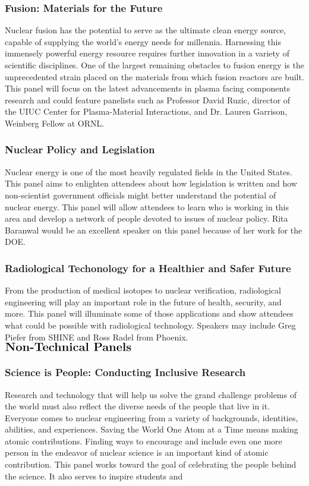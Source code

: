 \subsubsection{Fusion: Materials for the Future}
Nuclear fusion has the potential to serve as the ultimate clean energy source, capable of supplying the world’s energy needs for millennia. Harnessing this immensely powerful energy resource requires further innovation in a variety of scientific disciplines. One of the largest remaining obstacles to fusion energy is the unprecedented strain placed on the materials from which fusion reactors are built. This panel will focus on the latest advancements in plasma facing components research and could feature panelists such as Professor David Ruzic, director of the UIUC Center for Plasma-Material Interactions, and Dr. Lauren Garrison, Weinberg Fellow at ORNL.

\subsubsection{Nuclear Policy and Legislation}
Nuclear energy is one of the most heavily regulated fields in the United States. This panel aims to enlighten attendees about how legislation is written and how non-scientist government officials might better understand the potential of nuclear energy. This panel will allow attendees to learn who is working in this area and develop a network of people devoted to issues of nuclear policy.
Rita Baranwal would be an excellent speaker on this panel because of her work for the DOE.

\subsubsection{Radiological Techonology for a Healthier and Safer Future}
From the production of medical isotopes to nuclear verification, radiological engineering will play an important role in the future of health, security, and more. This panel will illuminate some of those applications and show attendees what could be possible with radiological technology. Speakers may include Greg Piefer from SHINE and Ross Radel from Phoenix.\\

$\Large\textbf{Non-Technical Panels}$

\subsubsection{Science is People: Conducting Inclusive Research}
Research and technology that will help us solve the grand challenge problems of the world must also reflect the diverse needs of the people that live in it. Everyone comes to nuclear engineering from a variety of backgrounds, identities, abilities, and experiences. Saving the World One Atom at a Time means making atomic contributions. Finding ways to encourage and include even one more person in the endeavor of nuclear science is an important kind of atomic contribution. This panel works toward the goal of celebrating the people behind the science. It also serves to inspire students and 

